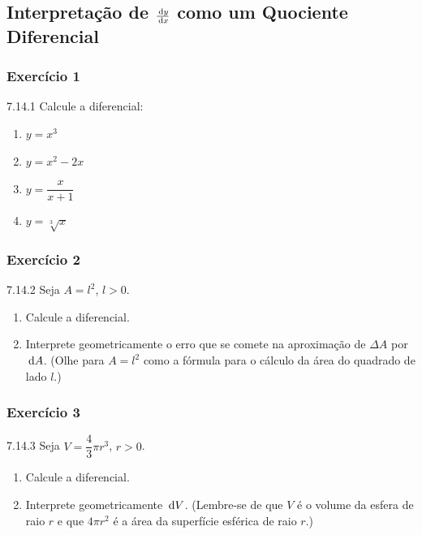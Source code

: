 \subsection[Interpretação de $\diff y/\diff x$ como Quociente Diferencial]{Interpretação de $\frac{\,\mathrm{d} y}{\,\mathrm{d} x}$ como um Quociente Diferencial}

\subsubsection*{Exercício 1}
\begin{exercicio}[1]{7.14.1}
Calcule a diferencial:
\begin{enumerate}[label=\alph*)]
    \item $y = x^3$
    \item $y = x^2 - 2x$
    \item $y = \dfrac{x}{x + 1}$
    \item $y = \sqrt[3]{x}$
\end{enumerate}
\end{exercicio}

\subsubsection*{Exercício 2}
\begin{exercicio}[2]{7.14.2}
Seja $A = l^2$, $l > 0$.
\begin{enumerate}[label=\alph*)]
    \item Calcule a diferencial.
    \item Interprete geometricamente o erro que se comete na aproximação de $\Delta A$ por $\,\mathrm{d} A$. (Olhe para $A = l^2$ como a fórmula para o cálculo da área do quadrado de lado $l$.)
\end{enumerate}
\end{exercicio}

\subsubsection*{Exercício 3}
\begin{exercicio}[3]{7.14.3}
Seja $V = \dfrac{4}{3}\pi r^3$, $r > 0$.
\begin{enumerate}[label=\alph*)]
    \item Calcule a diferencial.
    \item Interprete geometricamente $\,\mathrm{d} V$. (Lembre-se de que $V$ é o volume da esfera de raio $r$ e que $4\pi r^2$ é a área da superfície esférica de raio $r$.)
\end{enumerate}
\end{exercicio}

